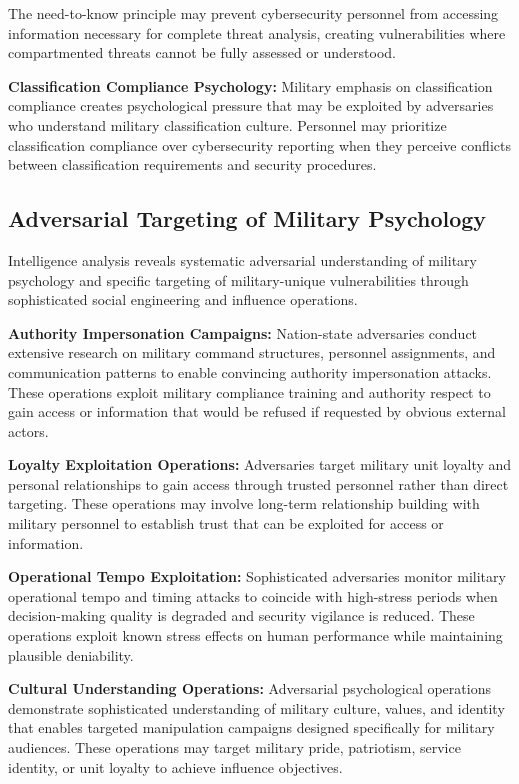 \documentclass[10pt, twocolumn]{article}
\begin{document}
The need-to-know principle may prevent cybersecurity personnel from accessing information necessary for complete threat analysis, creating vulnerabilities where compartmented threats cannot be fully assessed or understood.

\textbf{Classification Compliance Psychology:} Military emphasis on classification compliance creates psychological pressure that may be exploited by adversaries who understand military classification culture. Personnel may prioritize classification compliance over cybersecurity reporting when they perceive conflicts between classification requirements and security procedures.

\subsection{Adversarial Targeting of Military Psychology}

Intelligence analysis reveals systematic adversarial understanding of military psychology and specific targeting of military-unique vulnerabilities through sophisticated social engineering and influence operations.

\textbf{Authority Impersonation Campaigns:} Nation-state adversaries conduct extensive research on military command structures, personnel assignments, and communication patterns to enable convincing authority impersonation attacks. These operations exploit military compliance training and authority respect to gain access or information that would be refused if requested by obvious external actors.

\textbf{Loyalty Exploitation Operations:} Adversaries target military unit loyalty and personal relationships to gain access through trusted personnel rather than direct targeting. These operations may involve long-term relationship building with military personnel to establish trust that can be exploited for access or information.

\textbf{Operational Tempo Exploitation:} Sophisticated adversaries monitor military operational tempo and timing attacks to coincide with high-stress periods when decision-making quality is degraded and security vigilance is reduced. These operations exploit known stress effects on human performance while maintaining plausible deniability.

\textbf{Cultural Understanding Operations:} Adversarial psychological operations demonstrate sophisticated understanding of military culture, values, and identity that enables targeted manipulation campaigns designed specifically for military audiences. These operations may target military pride, patriotism, service identity, or unit loyalty to achieve influence objectives.
\end{document}
